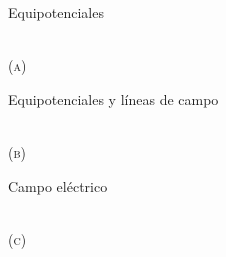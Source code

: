 \begin{figure}[t]
\centering
\newcommand{\icono}{%
  \draw[-{Stealth[length=2.8pt,width=2.6pt]}, mmarojo, line width=0.9pt] (0,0) -- (0,0.95);
  \draw[-{Stealth[length=2.8pt,width=2.6pt]}, mmarojo, line width=0.9pt] (0,0) -- (0,-0.95);
  \fill[mmarojo] (0,0) circle (0.2);}
\begin{minipage}[t]{0.325\textwidth}\centering
{\footnotesize Equipotenciales}\\[3pt]
\\[1pt]{\small\scshape (a)}
\end{minipage}\hfill
\begin{minipage}[t]{0.325\textwidth}\centering
{\footnotesize Equipotenciales y líneas de campo}\\[3pt]
\\[1pt]{\small\scshape (b)}
\end{minipage}\hfill
\begin{minipage}[t]{0.325\textwidth}\centering
{\footnotesize Campo eléctrico}\\[3pt]
\\[1pt]{\small\scshape (c)}

\end{minipage}
\end{figure}
